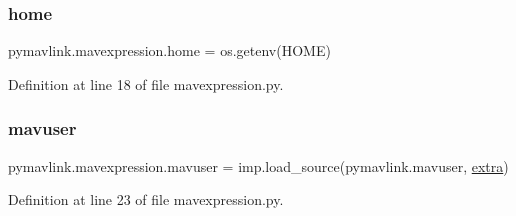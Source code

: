 \mbox{\label{namespacepymavlink_1_1mavexpression_afc944dcbe25c09a86ea53d042ce147ad}} 
\subsubsection{\texorpdfstring{home}{home}}
{\footnotesize\ttfamily pymavlink.\+mavexpression.\+home = os.\+getenv(\textquotesingle{}H\+O\+ME\textquotesingle{})}



Definition at line 18 of file mavexpression.\+py.

\mbox{\label{namespacepymavlink_1_1mavexpression_a4b72830e24885390bf68490e1acfcec7}} 
\subsubsection{\texorpdfstring{mavuser}{mavuser}}
{\footnotesize\ttfamily pymavlink.\+mavexpression.\+mavuser = imp.\+load\+\_\+source(\textquotesingle{}pymavlink.\+mavuser\textquotesingle{}, \mbox{\hyperlink{namespacepymavlink_1_1mavexpression_a1a68cb085c05aa0acd7c862299f8ea74}{extra}})}



Definition at line 23 of file mavexpression.\+py.

